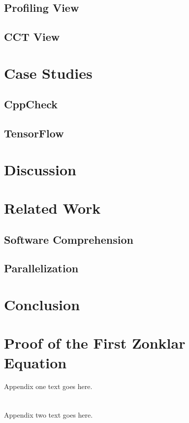 \documentclass[conference]{IEEEtran}
\begin{document}
\subsection{Profiling View}
\label{sec:profiling_view}

\subsection{CCT View}
\label{cct_view}

\section{Case Studies}
\label{sec:case_studies}

\subsection{CppCheck}
\label{sec:cppcheck}

\subsection{TensorFlow}
\label{sec:tensorflow}

\section{Discussion}
\label{sec:discussion}

\section{Related Work}
\label{sec:related_work}

\subsection{Software Comprehension}
\label{sec:software_comprehension}

\subsection{Parallelization}
\label{sec:related_work_parallelization}

\section{Conclusion}
\label{sec:conclusion}

\appendices
\section{Proof of the First Zonklar Equation}
Appendix one text goes here.

\section{}
Appendix two text goes here.

\ifCLASSOPTIONcaptionsoff
  \newpage
\fi
\end{document}
